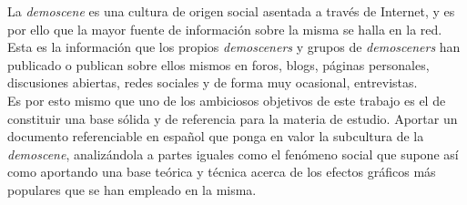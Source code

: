 La \emph{demoscene} es una cultura de origen social asentada a través de Internet, y es por ello que la mayor fuente de información sobre la misma se halla en la red. Esta es la información que los propios \emph{demosceners} y grupos de \emph{demosceners} han publicado o publican sobre ellos mismos en foros, blogs, páginas personales, discusiones abiertas, redes sociales y de forma muy ocasional, entrevistas.\\

Es por esto mismo que uno de los ambiciosos objetivos de este trabajo es el de constituir una base sólida y de referencia para la materia de estudio. Aportar un documento referenciable en español que ponga en valor la subcultura de la \emph{demoscene}, analizándola a partes iguales como el fenómeno social que supone así como aportando una base teórica y técnica acerca de los efectos gráficos más populares que se han empleado en la misma.
